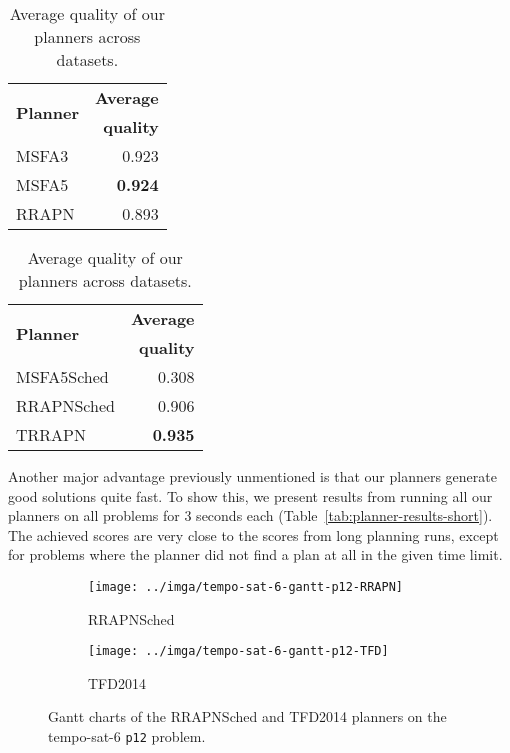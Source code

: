 {\begin{table}[tb]
\centering
\begin{subtable}[t]{0.48\textwidth}
\centering
\begin{tabular}{lr}
\toprule
\multirow{2}{*}{\textbf{Planner}} & \textbf{Average}\\
& \textbf{quality}\\
\midrule
MSFA3 & 0.923\\
MSFA5 & \textbf{0.924}\\
RRAPN & 0.893\\
\bottomrule
\end{tabular}
\caption{Average quality on sequential datasets.}
\label{tab:seq-summary}
\end{subtable}
\quad
\begin{subtable}[t]{0.48\textwidth}
\centering
\begin{tabular}{lr}
\toprule
\multirow{2}{*}{\textbf{Planner}} & \textbf{Average}\\
& \textbf{quality}\\
\midrule
MSFA5Sched & 0.308\\
RRAPNSched & 0.906\\
TRRAPN & \textbf{0.935}\\
\bottomrule
\end{tabular}
\caption{Average quality the temporal dataset.}
\label{tab:tempo-summary}
\end{subtable}
\caption{Average quality of our planners across datasets.}
\label{tab:planner-summary}
\end{table}

Another major advantage previously unmentioned is that
our planners generate good solutions quite fast.
To show this, we present results from running all our planners on all problems for 3 seconds each (Table~\ref{tab:planner-results-short}).
The achieved scores are very close to the
scores from long planning runs, except for problems
where the planner did not find a plan at all in the
given time limit.

\begin{figure}[!b]
\centering
\begin{subfigure}{0.8\textwidth}
\centering
\texttt{[image: ../imga/tempo-sat-6-gantt-p12-RRAPN]}
\caption{RRAPNSched}
\label{fig:tempo-sat-6-gantt-12-rrapn}
\end{subfigure}

\begin{subfigure}{0.8\textwidth}
\vspace{0.2cm}
\centering
\texttt{[image: ../imga/tempo-sat-6-gantt-p12-TFD]}
\caption{TFD2014}
\label{fig:tempo-sat-6-gantt-12-tfd}
\end{subfigure}
\caption{Gantt charts of the RRAPNSched and TFD2014 planners on the tempo-sat-6 \texttt{p12} problem.}
\label{fig:tempo-sat-6-gantt}
\end{figure}

}
